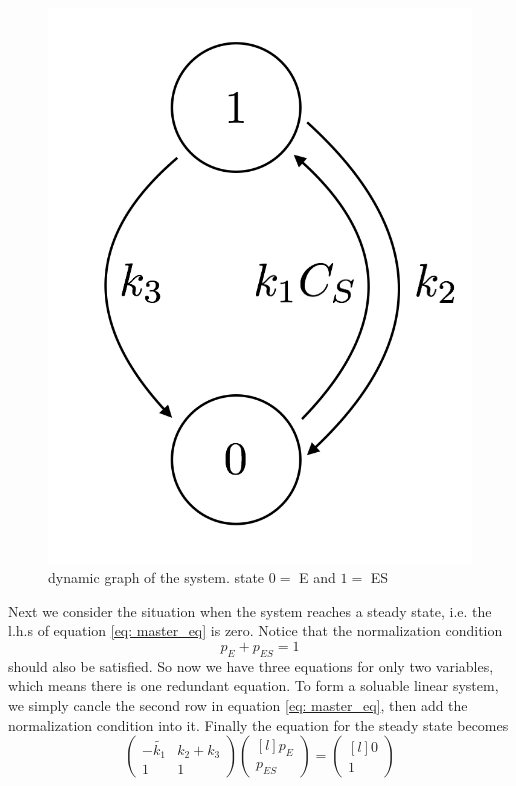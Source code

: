 	\begin{figure}
		\centering
		\includegraphics[scale=0.3]{img/dynamic_graph.png}
		\caption{dynamic graph of the system. state $0=$ E and $1=$ ES}
		\label{img:dynamics}
	\end{figure}

	Next we consider the situation when the system reaches a steady state, i.e. the l.h.s of equation \eqref{eq: master_eq} is zero. Notice that the normalization condition 
	\begin{equation}
		p_E + p_{ES} = 1
	\end{equation}
	should also be satisfied. So now we have three equations for only two variables, which means there is one redundant equation. To form a soluable linear system, we simply cancle the second row in equation \eqref{eq: master_eq}, then add the normalization condition into it. Finally the equation for the steady state becomes
	\begin{equation}
		\begin{pmatrix*}
			-\widetilde{k_1} &  k_2+k_3 \\
						1	 &  1 
		\end{pmatrix*}
		\begin{pmatrix*}[l] p_E \\ p_{ES} \end{pmatrix*} = 
		\begin{pmatrix*}[l] 0 \\ 1 \end{pmatrix*}	
		\label{eq: steady_state_eq}
	\end{equation}


